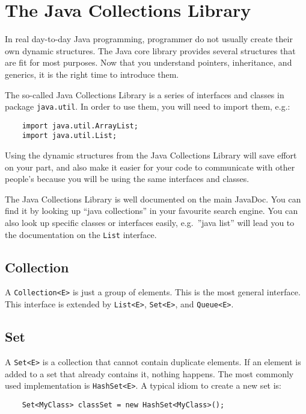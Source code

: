 
\section{The Java Collections Library}
\label{sec:java-coll-libr}

In real day-to-day Java programming, programmer do not usually create
their own dynamic structures. The Java core library provides several
structures that are fit for most purposes. Now that you understand
pointers, inheritance, and generics, it is the right time to introduce
them.

The so-called Java Collections Library is a series of interfaces and
classes in package \verb+java.util+. In order to use them, you will
need to import them, e.g.:

\begin{verbatim}
    import java.util.ArrayList;
    import java.util.List;
\end{verbatim}

Using the dynamic structures from the Java Collections Library will
save effort on your part, and also make it easier for your code to
communicate with other people's because you will be using the same
interfaces and classes. 

The Java Collections Library is well documented on the main
JavaDoc. You can find it by looking up ``java collections'' in your
favourite search engine. You can also look up specific classes or
interfaces easily, e.g.~''java list'' will lead you to the
documentation on the \verb+List+ interface. 

\subsection{Collection}
\label{sec:collection}

A \verb+Collection<E>+ is just a group of elements. This is the most
general interface. This interface is extended by \verb+List<E>+,
\verb+Set<E>+, and \verb+Queue<E>+. 

\subsection{Set}
\label{sec:set}

A \verb+Set<E>+ is a collection that cannot contain duplicate
elements. If an element is added to a set that already contains it,
nothing happens. The most commonly used implementation is
\verb+HashSet<E>+. A typical idiom to create a new set is:

\begin{verbatim}
    Set<MyClass> classSet = new HashSet<MyClass>();
\end{verbatim}

